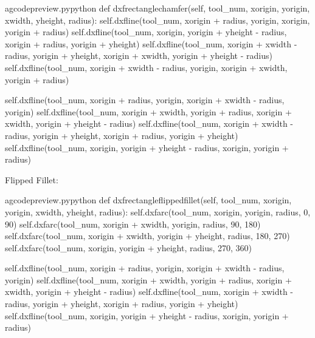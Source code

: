 \documentclass{ltxdoc}
\begin{document}
\lstset{firstnumber=\thegcpy}
\begin{writecode}{a}{gcodepreview.py}{python}
    def dxfrectanglechamfer(self, tool_num, xorigin, yorigin, xwidth, yheight, radius):
        self.dxfline(tool_num, xorigin + radius, yorigin, xorigin, yorigin + radius)
        self.dxfline(tool_num, xorigin, yorigin + yheight - radius, xorigin + radius, yorigin + yheight)
        self.dxfline(tool_num, xorigin + xwidth - radius, yorigin + yheight, xorigin + xwidth, yorigin + yheight - radius)
        self.dxfline(tool_num, xorigin + xwidth - radius, yorigin, xorigin + xwidth, yorigin + radius)

        self.dxfline(tool_num, xorigin + radius, yorigin, xorigin + xwidth - radius, yorigin)
        self.dxfline(tool_num, xorigin + xwidth, yorigin + radius, xorigin + xwidth, yorigin + yheight - radius)
        self.dxfline(tool_num, xorigin + xwidth - radius, yorigin + yheight, xorigin + radius, yorigin + yheight)
        self.dxfline(tool_num, xorigin, yorigin + yheight - radius, xorigin, yorigin + radius)

\end{writecode}
\addtocounter{gcpy}{11}

Flipped Fillet:

\lstset{firstnumber=\thegcpy}
\begin{writecode}{a}{gcodepreview.py}{python}
    def dxfrectangleflippedfillet(self, tool_num, xorigin, yorigin, xwidth, yheight, radius):
        self.dxfarc(tool_num, xorigin, yorigin, radius,   0,  90)
        self.dxfarc(tool_num, xorigin + xwidth, yorigin, radius,  90, 180)
        self.dxfarc(tool_num, xorigin + xwidth, yorigin + yheight, radius, 180, 270)
        self.dxfarc(tool_num, xorigin, yorigin + yheight, radius, 270, 360)

        self.dxfline(tool_num, xorigin + radius, yorigin, xorigin + xwidth - radius, yorigin)
        self.dxfline(tool_num, xorigin + xwidth, yorigin + radius, xorigin + xwidth, yorigin + yheight - radius)
        self.dxfline(tool_num, xorigin + xwidth - radius, yorigin + yheight, xorigin + radius, yorigin + yheight)
        self.dxfline(tool_num, xorigin, yorigin + yheight - radius, xorigin, yorigin + radius)

\end{writecode}
\addtocounter{gcpy}{11}
\end{document}
